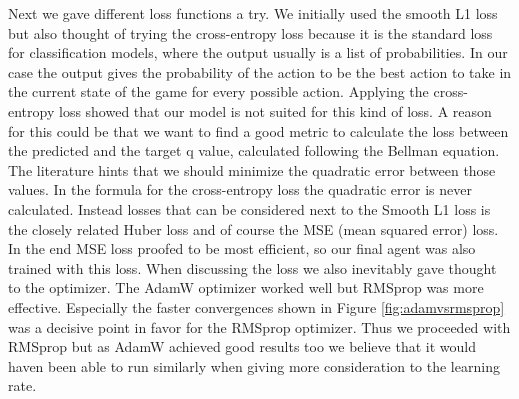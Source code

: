Next we gave different loss functions a try. We initially used the smooth L1 loss but also thought of trying the cross-entropy loss because it is the standard loss for classification models, where the output usually is a list of probabilities. In our case the output gives the probability of the action to be the best action to take in the current state of the game for every possible action. Applying the cross-entropy loss showed that our model is not suited for this kind of loss. A reason for this could be that we want to find a good metric to calculate the loss between the predicted and the target q value, calculated following the Bellman equation. The literature hints that we should minimize the quadratic error between those values. In the formula for the cross-entropy loss the quadratic error is never calculated. Instead losses that can be considered next to the Smooth L1 loss is the closely related Huber loss and of course the MSE (mean squared error) loss. In the end MSE loss proofed to be most efficient, so our final agent was also trained with this loss. When discussing the loss we also inevitably gave thought to the optimizer. The AdamW optimizer worked well but RMSprop was more effective. Especially the faster convergences shown in Figure \ref{fig:adamvsrmsprop} was a decisive point in favor for the RMSprop optimizer. Thus we proceeded with RMSprop but as AdamW achieved good results too we believe that it would haven been able to run similarly when giving more consideration to the learning rate.
